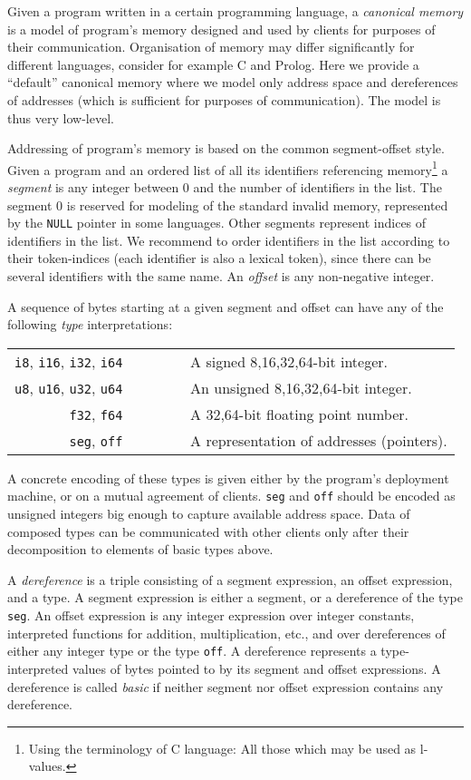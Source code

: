 \documentclass[envcountsame]{llncs}
\begin{document}
Given a program written in a certain programming language, a \emph{canonical
memory} is a model of program's memory designed and used by clients for purposes
of their communication. Organisation of memory may differ significantly for
different languages, consider for example C and Prolog. Here we provide a
``default'' canonical memory where we model only address space and dereferences
of addresses (which is sufficient for purposes of communication). The model is
thus very low-level.

Addressing of program's memory is based on the common segment-offset style.
Given a program and an ordered list of all its identifiers referencing
memory\footnote{Using the terminology of C language: All those which may be used
as l-values.} a \emph{segment} is any integer between 0 and the number of
identifiers in the list. The segment 0 is reserved for modeling of the standard
invalid memory, represented by the \texttt{NULL} pointer in some languages.
Other segments represent indices of identifiers in the list. We recommend to
order identifiers in the list according to their token-indices (each identifier
is also a lexical token), since there can be several identifiers with the same
name. An \emph{offset} is any non-negative integer.

A sequence of bytes starting at a given segment and offset can have any of the
following \emph{type} interpretations:
\begin{center}
\begin{tabular}{rl}
\texttt{i8}, \texttt{i16}, \texttt{i32}, \texttt{i64} ~~~&~~~
A signed 8,16,32,64-bit integer.  \\
\texttt{u8}, \texttt{u16}, \texttt{u32}, \texttt{u64} ~~~&~~~
An unsigned 8,16,32,64-bit integer.  \\
\texttt{f32}, \texttt{f64} ~~~&~~~
A 32,64-bit floating point number.  \\
\texttt{seg}, \texttt{off} ~~~&~~~
A representation of addresses (pointers). \\
\end{tabular}
\end{center}
A concrete encoding of these types is given either by the program's deployment
machine, or on a mutual agreement of clients. \texttt{seg} and \texttt{off}
should be encoded as unsigned integers big enough to capture available address
space. Data of composed types can be communicated with other clients only after
their decomposition to elements of basic types above.

A \emph{dereference} is a triple consisting of a segment expression, an offset
expression, and a type. A segment expression is either a segment, or a
dereference of the type \texttt{seg}. An offset expression is any integer
expression over integer constants, interpreted functions for addition,
multiplication, etc., and over dereferences of either any integer type or the
type \texttt{off}. A dereference represents a type-interpreted values of bytes
pointed to by its segment and offset expressions. A dereference is called
\emph{basic} if neither segment nor offset expression contains any dereference.
\end{document}
